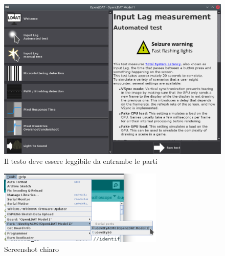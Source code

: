 \documentclass[12pt,a4paper]{report}
\begin{document}
	\begin{figure}[H]
		\centering
		\includegraphics[width=\textwidth]{Applicazione_files/gui_mainMenu2.png}
		\caption{Il testo deve essere leggibile da entrambe le parti}
		\label{fig:screen2}
	\end{figure}
	\begin{figure}[H]
		\centering
		\includegraphics[width=0.7\textwidth]{Dispositivo_files/flashing_03.png}
		\caption{Screenshot chiaro}
		\label{fig:screen3}
	\end{figure}
	\lipsum[5]
\end{document}
